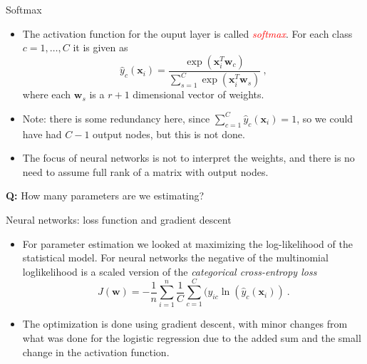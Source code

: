\documentclass[10pt,ignorenonframetext,]{beamer}
\begin{document}
\begin{frame}

\begin{block}{Softmax}

\begin{itemize}
\item
  The activation function for the ouput layer is called
  \emph{\textcolor{red}{softmax}}. For each class \(c=1,\ldots, C\) it
  is given as \[
  \hat{y}_c({\boldsymbol x}_i) = \frac{\exp({\boldsymbol x}_i^T{\boldsymbol w}_c)}{\sum_{s=1}^{C}\exp({\boldsymbol x}_i^T{\boldsymbol w}_s)} \ ,
  \] where each \({\boldsymbol w}_s\) is a \(r+1\) dimensional vector of
  weights.
\item
  Note: there is some redundancy here, since
  \(\sum_{c=1}^C {\hat y}_{c}({\boldsymbol x}_i)=1\), so we could have
  had \(C-1\) output nodes, but this is not done.
\item
  The focus of neural networks is not to interpret the weights, and
  there is no need to assume full rank of a matrix with output nodes.
\end{itemize}

\textbf{Q:} How many parameters are we estimating?

\end{block}

\end{frame}

\begin{frame}

\begin{block}{Neural networks: loss function and gradient descent}

\begin{itemize}
\item
  For parameter estimation we looked at maximizing the log-likelihood of
  the statistical model. For neural networks the negative of the
  multinomial loglikelihood is a scaled version of the \emph{categorical
  cross-entropy loss}
  \[ J({\boldsymbol w})=-\frac{1}{n}\sum_{i=1}^n\frac{1}{C} \sum_{c=1}^C (y_{ic}\ln({\hat{y}_c({\boldsymbol x}_i)}) \ .\]
\item
  The optimization is done using gradient descent, with minor changes
  from what was done for the logistic regression due to the added sum
  and the small change in the activation function.
\end{itemize}

\end{block}

\end{frame}
\end{document}
